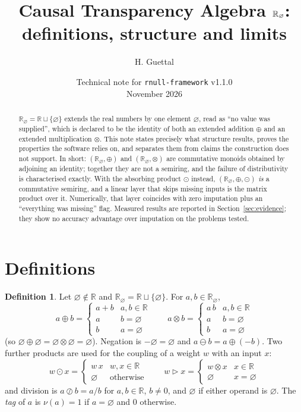 \documentclass[11pt,a4paper]{article}
\title{Causal Transparency Algebra $\Rn$:\\ definitions, structure and limits}
\author{H. Guettal}
\date{Technical note for \texttt{rnull-framework} v1.1.0 \\ November 2026}
\theoremstyle{definition}
\newtheorem{definition}[proposition]{Definition}
\theoremstyle{remark}
\newcommand{\R}{\mathbb{R}}
\newcommand{\Rn}{\R_{\varnothing}}
\newcommand{\nul}{\varnothing}
\newcommand{\op}{\oplus}
\newcommand{\ot}{\otimes}
\newcommand{\od}{\odot}
\newcommand{\sk}{\rhd}
\begin{document}
\maketitle

\begin{abstract}
\noindent
$\Rn=\R\sqcup\{\nul\}$ extends the real numbers by one element $\nul$, read as
``no value was supplied'', which is declared to be the identity of both an
extended addition $\op$ and an extended multiplication $\ot$. This note states
precisely what structure results, proves the properties the software relies
on, and separates them from claims the construction does not support. In
short: $(\Rn,\op)$ and $(\Rn,\ot)$ are commutative monoids obtained by adjoining
an identity; together they are not a semiring, and the failure of
distributivity is characterised exactly. With the absorbing product $\od$
instead, $(\Rn,\op,\od)$ \emph{is} a commutative semiring, and a linear layer
that skips missing inputs is the matrix product over it. Numerically, that
layer coincides with zero imputation plus an ``everything was missing'' flag.
Measured results are reported in Section~\ref{sec:evidence}; they show no
accuracy advantage over imputation on the problems tested.
\end{abstract}

\section{Definitions}

\begin{definition}
Let $\nul\notin\R$ and $\Rn=\R\sqcup\{\nul\}$. For $a,b\in\Rn$,
\[
a\op b=\begin{cases} a+b & a,b\in\R\\ a & b=\nul\\ b & a=\nul \end{cases}
\qquad
a\ot b=\begin{cases} a\,b & a,b\in\R\\ a & b=\nul\\ b & a=\nul \end{cases}
\]
(so $\nul\op\nul=\nul\ot\nul=\nul$). Negation is $-\nul=\nul$ and
$a\ominus b=a\op(-b)$. Two further products are used for the coupling of a
weight $w$ with an input $x$:
\[
w\od x=\begin{cases} w\,x & w,x\in\R\\ \nul & \text{otherwise} \end{cases}
\qquad
w\sk x=\begin{cases} w\ot x & x\in\R\\ \nul & x=\nul \end{cases}
\]
and division is $a\oslash b=a/b$ for $a,b\in\R$, $b\neq 0$, and $\nul$ if
either operand is $\nul$. The \emph{tag} of $a$ is $\nu(a)=1$ if $a=\nul$ and
$0$ otherwise.
\end{definition}
\end{document}
